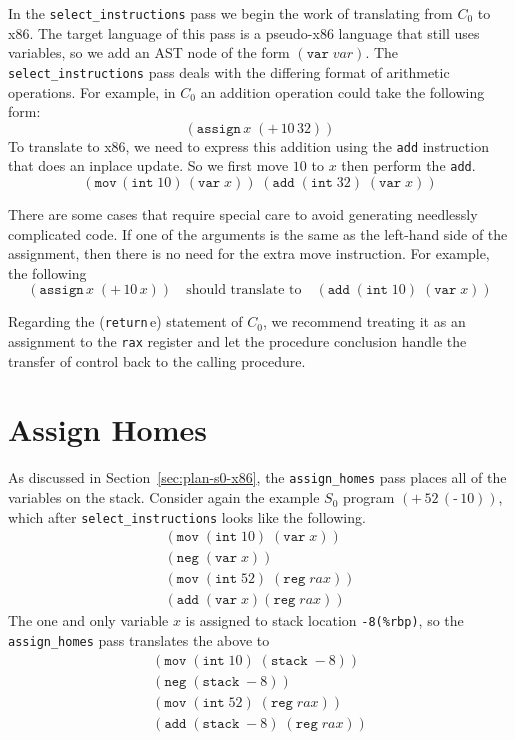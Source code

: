 \documentclass[12pt]{book}
\newcommand{\itm}[1]{\ensuremath{\mathit{#1}}}
\newcommand{\key}[1]{\texttt{#1}}
\newcommand{\UNIOP}[2]{(\key{#1}\,#2)}
\newcommand{\BINOP}[3]{(\key{#1}\,#2\,#3)}
\newcommand{\ASSIGN}[2]{(\key{assign}\,#1\;#2)}
\newcommand{\RETURN}[1]{(\key{return}\,#1)}
\newcommand{\INT}[1]{(\key{int}\;#1)}
\newcommand{\REG}[1]{(\key{reg}\;#1)}
\newcommand{\VAR}[1]{(\key{var}\;#1)}
\newcommand{\STACKLOC}[1]{(\key{stack}\;#1)}
\begin{document}
In the \key{select\_instructions} pass we begin the work of
translating from $C_0$ to x86. The target language of this pass is a
pseudo-x86 language that still uses variables, so we add an AST node
of the form $\VAR{\itm{var}}$.  The \key{select\_instructions} pass
deals with the differing format of arithmetic operations. For example,
in $C_0$ an addition operation could take the following form:
\[
\ASSIGN{x}{ \BINOP{+}{10}{32} }
\]
To translate to x86, we need to express this addition using the
\key{add} instruction that does an inplace update. So we first move
$10$ to $x$ then perform the \key{add}.
\[
(\key{mov}\,\INT{10}\, \VAR{x})\; (\key{add} \;\INT{32}\; \VAR{x})
\]

There are some cases that require special care to avoid generating
needlessly complicated code. If one of the arguments is the same as
the left-hand side of the assignment, then there is no need for the
extra move instruction.  For example, the following
\[
\ASSIGN{x}{ \BINOP{+}{10}{x} }
\quad\text{should translate to}\quad
(\key{add} \; \INT{10}\; \VAR{x})
\]

Regarding the \RETURN{e} statement of $C_0$, we recommend treating it
as an assignment to the \key{rax} register and let the procedure
conclusion handle the transfer of control back to the calling
procedure.

\section{Assign Homes}
\label{sec:assign-s0}

As discussed in Section~\ref{sec:plan-s0-x86}, the
\key{assign\_homes} pass places all of the variables on the stack.
Consider again the example $S_0$ program $\BINOP{+}{52}{ \UNIOP{-}{10} }$,
which after \key{select\_instructions} looks like the following.
\[
\begin{array}{l}
(\key{mov}\;\INT{10}\; \VAR{x})\\
(\key{neg}\; \VAR{x})\\
(\key{mov}\; \INT{52}\; \REG{\itm{rax}})\\
(\key{add}\; \VAR{x} \REG{\itm{rax}})
\end{array}
\]
The one and only variable $x$ is assigned to stack location
\key{-8(\%rbp)}, so the \key{assign\_homes} pass translates the
above to
\[
\begin{array}{l}
(\key{mov}\;\INT{10}\; \STACKLOC{{-}8})\\
(\key{neg}\; \STACKLOC{{-}8})\\
(\key{mov}\; \INT{52}\; \REG{\itm{rax}})\\
(\key{add}\; \STACKLOC{{-}8}\; \REG{\itm{rax}})
\end{array}
\]
\end{document}
